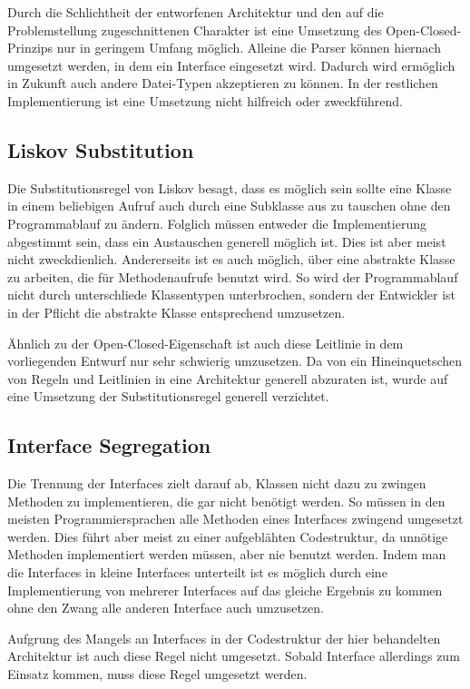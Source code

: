 {	Durch die Schlichtheit der entworfenen Architektur und den auf die Problemstellung zugeschnittenen Charakter ist eine Umsetzung des Open-Closed-Prinzips nur in geringem Umfang möglich. Alleine die Parser können hiernach umgesetzt werden, in dem ein Interface eingesetzt wird. Dadurch wird ermöglich in Zukunft auch andere Datei-Typen akzeptieren zu können.
	In der restlichen Implementierung ist eine Umsetzung nicht hilfreich oder zweckführend.
	
	\subsection{Liskov Substitution}
	Die Substitutionsregel von Liskov besagt, dass es möglich sein sollte eine Klasse in einem beliebigen Aufruf auch durch eine Subklasse aus zu tauschen ohne den Programmablauf zu ändern.
	Folglich müssen entweder die Implementierung abgestimmt sein, dass ein Austauschen generell möglich ist. Dies ist aber meist nicht zweckdienlich.
	Andererseits ist es auch möglich, über eine abstrakte Klasse zu arbeiten, die für Methodenaufrufe benutzt wird. So wird der Programmablauf nicht durch unterschliede Klassentypen unterbrochen, sondern der Entwickler ist in der Pflicht die abstrakte Klasse entsprechend umzusetzen.
	
	Ähnlich zu der Open-Closed-Eigenschaft ist auch diese Leitlinie in dem vorliegenden Entwurf nur sehr schwierig umzusetzen. Da von ein Hineinquetschen von Regeln und Leitlinien in eine Architektur generell abzuraten ist, wurde auf eine Umsetzung der Substitutionsregel generell verzichtet.
	
	\subsection{Interface Segregation}
	Die Trennung der Interfaces zielt darauf ab, Klassen nicht dazu zu zwingen Methoden zu implementieren, die gar nicht benötigt werden. So müssen in den meisten Programmiersprachen alle Methoden eines Interfaces zwingend umgesetzt werden. Dies führt aber meist zu einer aufgeblähten Codestruktur, da unnötige Methoden implementiert werden müssen, aber nie benutzt werden.
	Indem man die Interfaces in kleine Interfaces unterteilt ist es möglich durch eine Implementierung von mehrerer Interfaces auf das gleiche Ergebnis zu kommen ohne den Zwang alle anderen Interface auch umzusetzen.
	
	Aufgrung des Mangels an Interfaces in der Codestruktur der hier behandelten Architektur ist auch diese Regel nicht umgesetzt. Sobald Interface allerdings zum Einsatz kommen, muss diese Regel umgesetzt werden.
	
}
